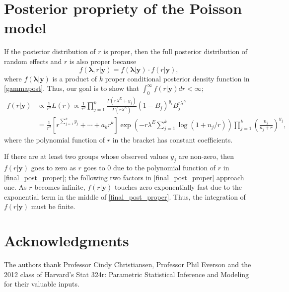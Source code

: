 \documentclass[article]{jss}
\begin{document}
\section{Posterior propriety of the Poisson model}\label{propriety_poisson}
If the posterior distribution of $r$ is proper, then the full posterior distribution of random effects and $r$ is also proper because 
\begin{equation}
f(\boldsymbol{\lambda}, r\vert \boldsymbol{y})=f(\boldsymbol{\lambda}\vert \boldsymbol{y})\cdot f(r\vert \boldsymbol{y}),
\end{equation} 
where $f(\boldsymbol{\lambda}\vert \boldsymbol{y})$ is a product of $k$ proper conditional posterior density function in \eqref{gammapost}. Thus, our goal is to show that $\int_0^\infty f(r\vert \boldsymbol{y})dr<\infty$;
\begin{align}
f(r\vert\boldsymbol{y})&\propto \frac{1}{r^2}L(r)\propto\frac{1}{r^2}\prod^{k}_{j=1} \frac{\Gamma(r \lambda^E+y_j)}{\Gamma(r\lambda^E)}(1-B_{j})^{y_{i}}B_{j}^{r \lambda^E}\\
&=\frac{1}{r^2}\left[r^{\sum_{j=1}^ky_j}+\cdots+a_k r^{k}\right]\exp\left(-r\lambda^E\sum_{j=1}^k\log(1+n_j/r)\right)\prod_{j=1}^k\left(\frac{n_j}{n_j+r}\right)^{y_j} \label{final_post_proper},
\end{align}
where the polynomial function of $r$ in the bracket has constant coefficients. 

If there are at least two groups whose observed values $y_j$ are non-zero, then $f(r\vert\boldsymbol{y})$ goes to zero as $r$ goes to 0 due to the polynomial function of $r$ in \eqref{final_post_proper}; the following two factors in \eqref{final_post_proper} approach one. As $r$ becomes infinite, $f(r\vert\boldsymbol{y})$ touches zero exponentially fast due to the exponential term in the middle of \eqref{final_post_proper}. Thus, the integration of $f(r\vert\boldsymbol{y})$ must be finite.



\section*{Acknowledgments}
The authors thank Professor Cindy Christiansen, Professor Phil Everson and the 2012 class of Harvard's Stat 324r: Parametric Statistical Inference and Modeling for their valuable inputs.



\end{document}
